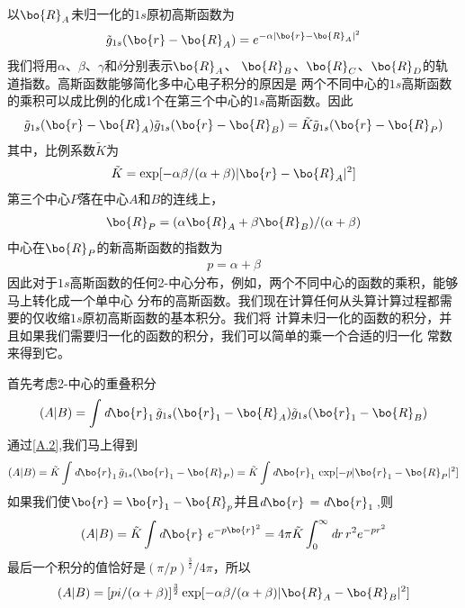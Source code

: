 以$\bo{R}_A$未归一化的$1s$原初高斯函数为
\begin{align}
	\label{A.1}
	\tilde{g}_{1s}(\bo{r}-\bo{R}_A)=e^{-\alpha\lvert \bo{r}-\bo{R}_A \rvert ^2}
\end{align}
我们将用$\alpha$、$\beta$、$\gamma$和$\delta$分别表示$\bo{R}_A$、
$\bo{R}_B$、$\bo{R}_C$、$\bo{R}_D$的轨道指数。高斯函数能够简化多中心电子积分的原因是
两个不同中心的$1s$高斯函数的乘积可以成比例的化成1个在第三个中心的$1s$高斯函数。因此
\begin{align}
	\label{A.2}
	\tilde{g}_{1s}(\bo{r}-\bo{R}_A)\tilde{g}_{1s}(\bo{r}-\bo{R}_B)
	=\tilde{K}\tilde{g}_{1s}(\bo{r}-\bo{R}_P)
\end{align}
其中，比例系数$\tilde{K}$为
\begin{align}
	\label{A.3}
    \tilde{K}=\exp[-\alpha\beta/(\alpha+\beta)\lvert \bo{r}-\bo{R}_A \rvert ^2]
\end{align}
第三个中心$P$落在中心$A$和$B$的连线上，
\begin{align}
	\label{A.4}
	\bo{R}_P=(\alpha\bo{R}_A+\beta \bo{R}_B)/(\alpha+\beta)
\end{align}
中心在$\bo{R}_P$的新高斯函数的指数为
\begin{align}
	\label{A.5}
	p=\alpha+\beta
\end{align}
因此对于$1s$高斯函数的任何2-中心分布，例如，两个不同中心的函数的乘积，能够马上转化成一个单中心
分布的高斯函数。我们现在计算任何从头算计算过程都需要的仅收缩$1s$原初高斯函数的基本积分。我们将
计算未归一化的函数的积分，并且如果我们需要归一化的函数的积分，我们可以简单的乘一个合适的归一化
常数来得到它。

首先考虑2-中心的重叠积分
\begin{align}
	\label{A.6}
	(A|B)=\int \emph{d}\bo{r}_1\,\tilde{g}_{1s}(\bo{r}_1-\bo{R}_A)\tilde{g}_{1s}(\bo{r}_1-\bo{R}_B)
\end{align}
通过\autoref{A.2},我们马上得到
\begin{align}
	\label{A.7}
	(A|B)=\tilde{K}\int \emph{d}\bo{r}_1\,\tilde{g}_{1s}(\bo{r}_1-\bo{R}_P)
	=\tilde{K}\int \emph{d}\bo{r}_1\, \exp[-p\lvert \bo{r}_1-\bo{R}_P \rvert ^2]
\end{align}
如果我们使$\bo{r}=\bo{r}_1-\bo{R}_p$并且$\emph{d}\bo{r}\,=\emph{d}\bo{r}_1\,$,则
\begin{align}
	\label{A.8}
	(A|B)=\tilde{K}\int \emph{d}\bo{r}\,\,e^{-p\bo{r}^2}=4\pi\tilde{K}\int_0^{\infty} \emph{d}r\,r^2e^{-pr^2}
\end{align}
最后一个积分的值恰好是$(\pi/p)^{\frac{3}{2}}/{4\pi}$，所以
\begin{align}
	\label{A.9}
	(A|B)=[pi/(\alpha+\beta)]^{\frac{3}{2}}\exp[-\alpha\beta/(\alpha+\beta)\lvert \bo{R}_A-\bo{R}_B \rvert ^2]
\end{align}

